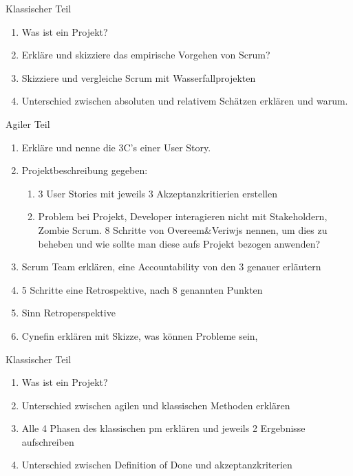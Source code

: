 \documentclass{article}
\author{Leopold Lemmermann}
\begin{document}
\createtitle

\begin{exercise}{Klassischer Teil}
  \begin{enumerate}
    \item Was ist ein Projekt?
    \item Erkläre und skizziere das empirische Vorgehen von Scrum?
    \item Skizziere und vergleiche Scrum mit Wasserfallprojekten
    \item Unterschied zwischen absoluten und relativem Schätzen erklären und warum.
  \end{enumerate}
\end{exercise}

\begin{exercise}{Agiler Teil}
  \begin{enumerate}
    \item Erkläre und nenne die 3C's einer User Story.
    \item Projektbeschreibung gegeben:
          \begin{enumerate}
            \item 3 User Stories mit jeweils 3 Akzeptanzkritierien erstellen
            \item Problem bei Projekt, Developer interagieren nicht mit Stakeholdern, Zombie Scrum. 8 Schritte von Overeem\&Veriwjs nennen, um dies zu beheben und wie sollte man diese aufs Projekt bezogen anwenden?
          \end{enumerate}
    \item Scrum Team erklären, eine Accountability von den 3 genauer erläutern
    \item 5 Schritte eine Retrospektive, nach 8 genannten Punkten
    \item Sinn Retroperspektive
    \item Cynefin erklären mit Skizze, was können Probleme sein,
  \end{enumerate}
\end{exercise}

\begin{exercise}{Klassischer Teil}
  \begin{enumerate}
    \item Was ist ein Projekt?
    \item Unterschied zwischen agilen und klassischen Methoden erklären
    \item Alle 4 Phasen des klassischen pm erklären und jeweils 2 Ergebnisse aufschreiben
    \item Unterschied zwischen Definition of Done und akzeptanzkriterien
  \end{enumerate}
\end{exercise}
\end{document}
